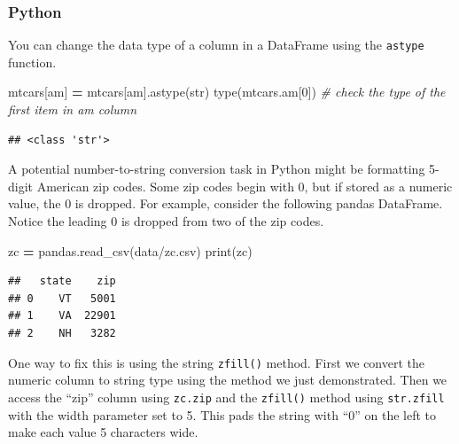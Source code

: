 \documentclass[
]{book}
\newenvironment{Shaded}{\begin{snugshade}}{\end{snugshade}}
\newcommand{\BuiltInTok}[1]{#1}
\newcommand{\CommentTok}[1]{\textcolor[rgb]{0.56,0.35,0.01}{\textit{#1}}}
\newcommand{\DecValTok}[1]{\textcolor[rgb]{0.00,0.00,0.81}{#1}}
\newcommand{\NormalTok}[1]{#1}
\newcommand{\OperatorTok}[1]{\textcolor[rgb]{0.81,0.36,0.00}{\textbf{#1}}}
\newcommand{\StringTok}[1]{\textcolor[rgb]{0.31,0.60,0.02}{#1}}
\begin{document}
\hypertarget{python-22}{%
\subsubsection*{Python}\label{python-22}}

You can change the data type of a column in a DataFrame using the \texttt{astype} function.

\begin{Shaded}
\begin{Highlighting}[]
\NormalTok{mtcars[}\StringTok{\textquotesingle{}am\textquotesingle{}}\NormalTok{] }\OperatorTok{=}\NormalTok{ mtcars[}\StringTok{\textquotesingle{}am\textquotesingle{}}\NormalTok{].astype(}\BuiltInTok{str}\NormalTok{)}
\BuiltInTok{type}\NormalTok{(mtcars.am[}\DecValTok{0}\NormalTok{]) }\CommentTok{\# check the type of the first item in \textquotesingle{}am\textquotesingle{} column}
\end{Highlighting}
\end{Shaded}

\begin{verbatim}
## <class 'str'>
\end{verbatim}

A potential number-to-string conversion task in Python might be formatting 5-digit American zip codes. Some zip codes begin with 0, but if stored as a numeric value, the 0 is dropped. For example, consider the following pandas DataFrame. Notice the leading 0 is dropped from two of the zip codes.

\begin{Shaded}
\begin{Highlighting}[]
\NormalTok{zc }\OperatorTok{=}\NormalTok{ pandas.read\_csv(}\StringTok{\textquotesingle{}data/zc.csv\textquotesingle{}}\NormalTok{)}
\BuiltInTok{print}\NormalTok{(zc)}
\end{Highlighting}
\end{Shaded}

\begin{verbatim}
##   state    zip
## 0    VT   5001
## 1    VA  22901
## 2    NH   3282
\end{verbatim}

One way to fix this is using the string \texttt{zfill()} method. First we convert the numeric column to string type using the method we just demonstrated. Then we access the ``zip'' column using \texttt{zc.zip} and the \texttt{zfill()} method using \texttt{str.zfill} with the width parameter set to 5. This pads the string with ``0'' on the left to make each value 5 characters wide.
\end{document}
